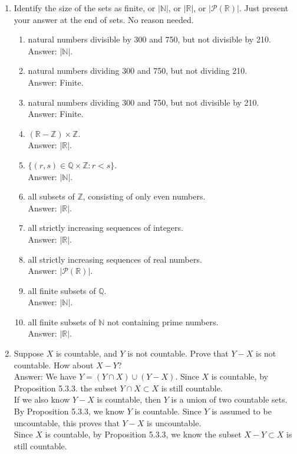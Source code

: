 \documentclass[11pt]{article}
\begin{document}
\begin{enumerate}
\item Identify the size of the sets as finite, or $|\mathbb{N}|$, or $|\mathbb{R}|$, or $|\mathcal{P}(\mathbb{R})|$. Just present your answer at the end of sets. No reason needed.
\begin{enumerate}
    \item natural numbers divisible by 300 and 750, but not divisible by 210.\\
    Answer: $|\mathbb{N}|$.
    \item natural numbers dividing 300 and 750, but not dividing 210.\\
    Answer: Finite.
    \item natural numbers dividing 300 and 750, but not divisible by 210.\\
    Answer: Finite.
    \item $(\mathbb{R} - \mathbb{Z})\times \mathbb{Z}$.\\
    Answer: $|\mathbb{R}|$.
    \item $\{(r,s)\in \mathbb{Q}\times \mathbb{Z}:r<s\}$.\\
    Answer: $|\mathbb{N}|$.
    \item all subsets of $\mathbb{Z}$, consisting of only even numbers.\\
    Answer: $|\mathbb{R}|$.
    \item all strictly increasing sequences of integers.\\
    Answer: $|\mathbb{R}|$.
    \item all strictly increasing sequences of real numbers.\\
    Answer: $|\mathcal{P}(\mathbb{R})|$.
    \item all finite subsets of $\mathbb{Q}$.\\
    Answer: $|\mathbb{N}|$.
    \item all finite subsets of $\mathbb{N}$ not containing prime numbers.\\
    Answer: $|\mathbb{R}|$.
\end{enumerate}


\item Suppose $X$ is countable, and $Y$ is not countable. Prove that $Y-X$ is not countable. How about $X-Y$?\\
    Answer: We have $Y = (Y \cap  X) \cup (Y - X)$. Since $X$ is countable, by Proposition 5.3.3. the subset $Y \cap X \subset X$ is still countable.\\
    If we also know $Y-X$ is countable, then $Y$ is a union of two countable sets. By Proposition 5.3.3, we know $Y$ is countable. Since $Y$ is assumed to be uncountable, this proves that $Y-X$ is uncountable.\\
    Since $X$ is countable, by Proposition 5.3.3, we know the subset $X-Y\subset X$ is still countable.




\end{enumerate}
\end{document}
